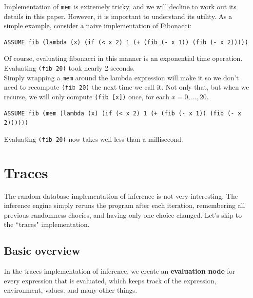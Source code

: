 \documentclass[10pt]{article}
\begin{document}
Implementation of {\tt mem} is extremely tricky, and we will decline to work out its details in this paper.  However, it is important to understand its utility.  As a simple example, consider a naive implementation of Fibonacci:


\begin{leftbar} \begin{small} \begin{verbatim}
ASSUME fib (lambda (x) (if (< x 2) 1 (+ (fib (- x 1)) (fib (- x 2)))))
\end{verbatim} \end{small} \end{leftbar}


\noindent Of course, evaluating fibonacci in this manner is an exponential time operation.  Evaluating {\tt (fib 20)} took nearly 2 seconds.  \\

Simply wrapping a {\tt mem} around the lambda expression will make it so we don't need to recompute {\tt (fib 20)} the next time we call it.  Not only that, but when we recurse, we will only compute {\tt (fib [x])} once, for each $x =0, \ldots, 20$.  

\begin{leftbar} \begin{small} \begin{verbatim}
ASSUME fib (mem (lambda (x) (if (< x 2) 1 (+ (fib (- x 1)) (fib (- x 2))))))
\end{verbatim} \end{small} \end{leftbar}


Evaluating {\tt (fib 20)} now takes well less than a millisecond.

\section{Traces}

The random database implementation of inference is not very interesting.  The inference engine simply reruns the program after each iteration, remembering all previous randomness chocies, and having only one choice changed.    Let's skip to the ``traces" implementation.


\subsection{Basic overview}

In the traces implementation of inference, we create an {\bf evaluation node} for every expression that is evaluated, which keeps track of the expression, environment, values, and many other things.  
\end{document}
